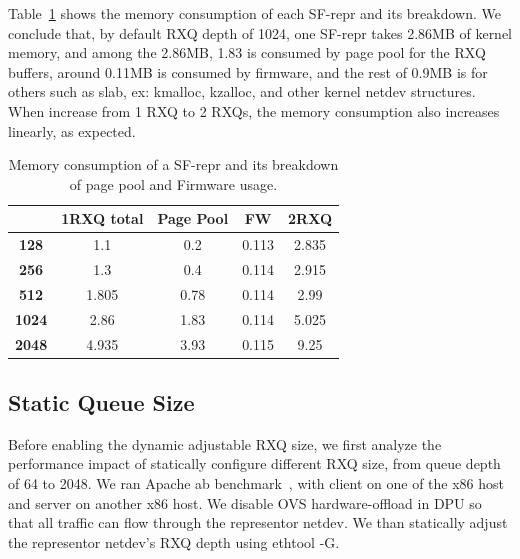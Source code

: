 \documentclass[letterpaper]{article}
\begin{document}
Table~\ref{tab:memory} shows the memory consumption of each SF-repr and its breakdown.
We conclude that, by default RXQ depth of 1024, one SF-repr takes 2.86MB of kernel
memory, and among the 2.86MB, 1.83 is consumed by page pool for the RXQ buffers,
around 0.11MB is consumed by firmware, and the rest of 0.9MB is for others
such as slab, ex: kmalloc, kzalloc, and other kernel netdev structures.
When increase from 1 RXQ to 2 RXQs, the memory consumption also increases linearly, as expected.

\begin{table}[h!]
\centering
\footnotesize

\begin{tabular}{|c|c|c|c|c|}
\hline
\textbf{} & \textbf{1RXQ total} & \textbf{Page Pool} & \textbf{FW} & \textbf{2RXQ} \\ \hline \hline
\textbf{128}  & 1.1   & 0.2  & 0.113 & 2.835 \\ \hline
\textbf{256}  & 1.3   & 0.4  & 0.114 & 2.915 \\ \hline
\textbf{512}  & 1.805 & 0.78 & 0.114 & 2.99  \\ \hline
\textbf{1024} & 2.86  & 1.83 & 0.114 & 5.025 \\ \hline
\textbf{2048} & 4.935 & 3.93 & 0.115 & 9.25  \\ \hline
\end{tabular}
\caption{Memory consumption of a SF-repr and its breakdown of page pool and Firmware usage.}
\label{tab:memory}
\end{table}

\subsection{Static Queue Size}
Before enabling the dynamic adjustable RXQ size, we first analyze the performance impact
of statically configure different RXQ size, from queue depth of 64 to 2048.
We ran Apache ab benchmark~\cite{ab}, with client on one of the x86 host and
server on another x86 host. We disable OVS hardware-offload in DPU so that all traffic
can flow through the representor netdev. We than statically adjust the representor
netdev's RXQ depth using ethtool -G. 
\end{document}
